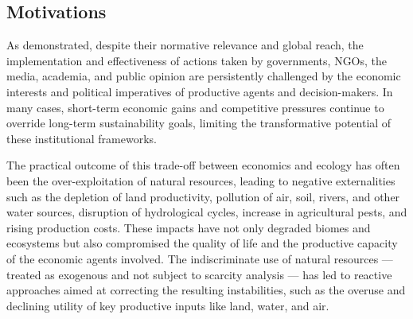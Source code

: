 \subsection{Motivations}

As demonstrated, despite their normative relevance and global reach, the implementation and effectiveness of actions taken by governments, NGOs, the media, academia, and public opinion are persistently challenged by the economic interests and political imperatives of productive agents and decision-makers. In many cases, short-term economic gains and competitive pressures continue to override long-term sustainability goals, limiting the transformative potential of these institutional frameworks.

The practical outcome of this trade-off between economics and ecology has often been the over-exploitation of natural resources, leading to negative externalities such as the depletion of land productivity, pollution of air, soil, rivers, and other water sources, disruption of hydrological cycles, increase in agricultural pests, and rising production costs. These impacts have not only degraded biomes and ecosystems but also compromised the quality of life and the productive capacity of the economic agents involved. The indiscriminate use of natural resources — treated as exogenous and not subject to scarcity analysis — has led to reactive approaches aimed at correcting the resulting instabilities, such as the overuse and declining utility of key productive inputs like land, water, and air.

